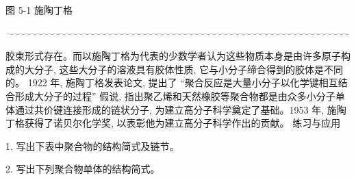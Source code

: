 \documentclass[10pt]{article}
\begin{document}
图 5-1 施陶丁格

\begin{center}
\includegraphics[max width=1.0\textwidth]{images/0190efc5-b58a-7c43-bfb0-e0a030df9cfd_139_332515.jpg}
\end{center}

胶束形式存在。而以施陶丁格为代表的少数学者认为这些物质本身是由许多原子构成的大分子, 这些大分子的溶液具有胶体性质, 它与小分子缔合得到的胶体是不同的。 1922 年, 施陶丁格发表论文, 提出了 “聚合反应是大量小分子以化学键相互结合形成大分子的过程” 假说, 指出聚乙烯和天然橡胶等聚合物都是由众多小分子单体通过共价键连接形成的链状分子, 为建立高分子科学奠定了基础。1953 年, 施陶丁格获得了诺贝尔化学奖, 以表彰他为建立高分子科学作出的贡献。 练习与应用

1. 写出下表中聚合物的结构简式及链节。

\begin{center}
\end{center}

2. 写出下列聚合物单体的结构简式。
\end{document}
